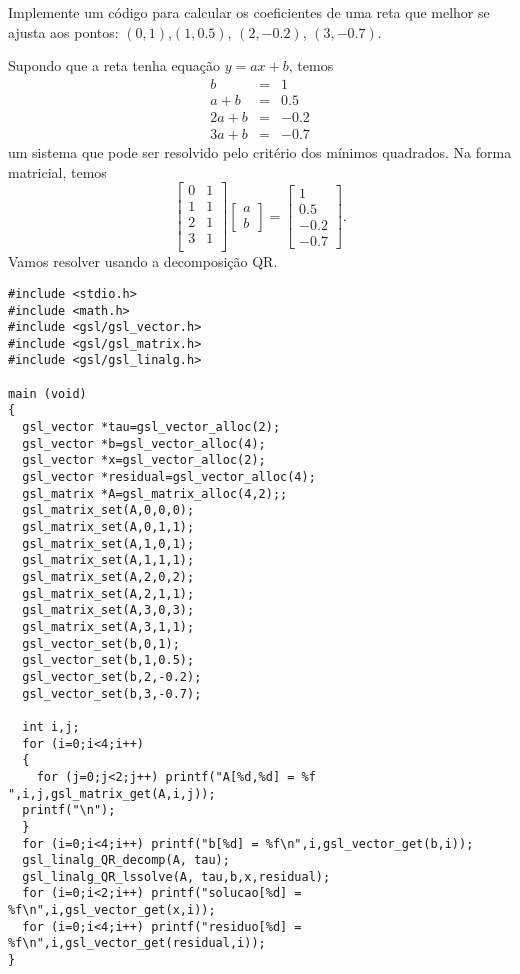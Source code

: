 \begin{ex}
Implemente um código para calcular os coeficientes de uma reta que melhor se ajusta aos pontos: $(0,1)$,$(1,0.5)$, $(2,-0.2)$, $(3,-0.7)$.
\end{ex}
Supondo que a reta tenha equação $y=ax+b$, temos
\begin{eqnarray}
 b&=&1\\
 a+b&=&0.5\\
 2a+b&=&-0.2\\
 3a+b&=&-0.7
\end{eqnarray}
um sistema que pode ser resolvido pelo critério dos mínimos quadrados. Na forma matricial, temos
$$
\left[\begin{array}{cc}
0&1\\
1&1\\
2&1\\
3&1\\
\end{array}\right]\left[\begin{array}{c}a\\b\end{array}\right]=
\left[\begin{array}{c}1\\0.5\\-0.2\\ -0.7\end{array}\right].
$$
Vamos resolver usando a decomposição QR.
\begin{verbatim}
#include <stdio.h>
#include <math.h>
#include <gsl/gsl_vector.h>
#include <gsl/gsl_matrix.h>
#include <gsl/gsl_linalg.h>

main (void)
{
  gsl_vector *tau=gsl_vector_alloc(2);
  gsl_vector *b=gsl_vector_alloc(4);
  gsl_vector *x=gsl_vector_alloc(2);
  gsl_vector *residual=gsl_vector_alloc(4);
  gsl_matrix *A=gsl_matrix_alloc(4,2);;
  gsl_matrix_set(A,0,0,0);
  gsl_matrix_set(A,0,1,1);
  gsl_matrix_set(A,1,0,1);
  gsl_matrix_set(A,1,1,1);
  gsl_matrix_set(A,2,0,2);
  gsl_matrix_set(A,2,1,1);
  gsl_matrix_set(A,3,0,3);
  gsl_matrix_set(A,3,1,1);
  gsl_vector_set(b,0,1);
  gsl_vector_set(b,1,0.5);
  gsl_vector_set(b,2,-0.2);
  gsl_vector_set(b,3,-0.7);

  int i,j;
  for (i=0;i<4;i++)
  {
    for (j=0;j<2;j++) printf("A[%d,%d] = %f ",i,j,gsl_matrix_get(A,i,j));
  printf("\n");
  }
  for (i=0;i<4;i++) printf("b[%d] = %f\n",i,gsl_vector_get(b,i));
  gsl_linalg_QR_decomp(A, tau);
  gsl_linalg_QR_lssolve(A, tau,b,x,residual);
  for (i=0;i<2;i++) printf("solucao[%d] = %f\n",i,gsl_vector_get(x,i));
  for (i=0;i<4;i++) printf("residuo[%d] = %f\n",i,gsl_vector_get(residual,i));
}
\end{verbatim}

